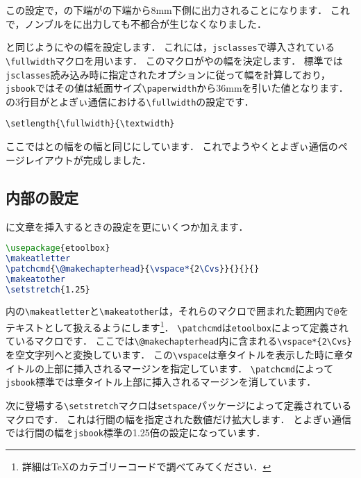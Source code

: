 この設定で，の下端がの下端から8mm下側に出力されることになります．
これで，ノンブルをに出力しても不都合が生じなくなりました．

と同じようにやの幅を設定します．
これには，\texttt{jsclasses}で導入されている\verb|\fullwidth|マクロを用います．
このマクロがやの幅を決定します．
標準では\texttt{jsclasses}読み込み時に指定されたオプションに従って幅を計算しており，
\texttt{jsbook}ではその値は紙面サイズ\verb|\paperwidth|から36mmを引いた値となります．
の3行目がとよぎぃ通信における\verb|\fullwidth|の設定です．
\begin{verbatim}
\setlength{\fullwidth}{\textwidth}
\end{verbatim}

ここではとの幅をの幅と同じにしています．
これでようやくとよぎぃ通信のページレイアウトが完成しました．

\subsection{内部の設定}

に文章を挿入するときの設定を更にいくつか加えます． 
\begin{lstlisting}[caption = \jyquote{本文}内文章の設定, label = list:body, language = tex]
\usepackage{etoolbox}
\makeatletter
\patchcmd{\@makechapterhead}{\vspace*{2\Cvs}}{}{}{}
\makeatother
\setstretch{1.25}
\end{lstlisting}

内の\verb|\makeatletter|と\verb|\makeatother|は，それらのマクロで囲まれた範囲内で\texttt{@}をテキストとして扱えるようにします\footnote{詳細は{\TeX}のカテゴリーコードで調べてみてください．}．
\verb|\patchcmd|は\verb|etoolbox|によって定義されているマクロです．
ここでは\verb|\@makechapterhead|内に含まれる\verb|\vspace*{2\Cvs}|を空文字列へと変換しています．
この\verb|\vspace|は章タイトルを表示した時に章タイトルの上部に挿入されるマージンを指定しています．
\verb|\patchcmd|によって\texttt{jsbook}標準では章タイトル上部に挿入されるマージンを消しています．

次に登場する\verb|\setstretch|マクロは\texttt{setspace}パッケージによって定義されているマクロです．
これは行間の幅を指定された数値だけ拡大します．
とよぎぃ通信では行間の幅を\texttt{jsbook}標準の1.25倍の設定になっています．

